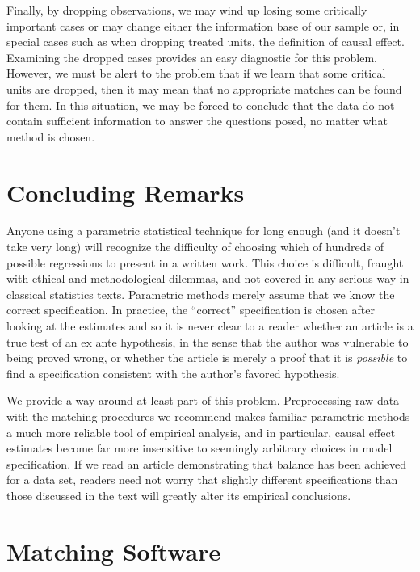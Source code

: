 \documentclass[11pt,titlepage]{article}
\begin{document}
Finally, by dropping observations, we may wind up losing some
critically important cases or may change either the information base
of our sample or, in special cases such as when dropping treated
units, the definition of causal effect.  Examining the dropped cases
provides an easy diagnostic for this problem.  However, we must be
alert to the problem that if we learn that some critical units are
dropped, then it may mean that no appropriate matches can be found for
them.  In this situation, we may be forced to conclude that the data
do not contain sufficient information to answer the questions posed,
no matter what method is chosen.

\section{Concluding Remarks}

Anyone using a parametric statistical technique for long enough (and
it doesn't take very long) will recognize the difficulty of choosing
which of hundreds of possible regressions to present in a written
work.  This choice is difficult, fraught with ethical and
methodological dilemmas, and not covered in any serious way in
classical statistics texts.  Parametric methods merely assume that we
know the correct specification.  In practice, the ``correct''
specification is chosen after looking at the estimates and so it is
never clear to a reader whether an article is a true test of an ex
ante hypothesis, in the sense that the author was vulnerable to being
proved wrong, or whether the article is merely a proof that it is
\emph{possible} to find a specification consistent with the author's
favored hypothesis.

We provide a way around at least part of this problem.  Preprocessing
raw data with the matching procedures we recommend makes familiar
parametric methods a much more reliable tool of empirical analysis,
and in particular, causal effect estimates become far more insensitive
to seemingly arbitrary choices in model specification.  If we read an
article demonstrating that balance has been achieved for a data set,
readers need not worry that slightly different specifications than
those discussed in the text will greatly alter its empirical
conclusions.

\appendix
\section{Matching Software}\label{s:matchit}
\end{document}
